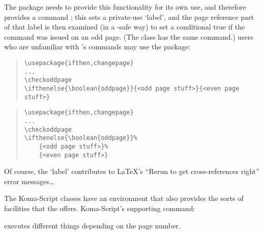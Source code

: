 The  package needs to provide this functionality
for its own use, and therefore provides a command ;
this sets a private-use `label', and the page reference part of that
label is then examined (in a -safe way) to set a
conditional  true if the command was issued on an odd
page.  (The  class has the same command.)  \latex{}
users who are unfamiliar with \tex{}'s  commands may use
the  package:
\begin{wideversion}
\begin{quote}
\begin{verbatim}
\usepackage{ifthen,changepage}
...
\checkoddpage
\ifthenelse{\boolean{oddpage}}{<odd page stuff>}{<even page stuff>}
\end{verbatim}
\end{quote}
\end{wideversion}
\begin{narrowversion}
\begin{quote}
\begin{verbatim}
\usepackage{ifthen,changepage}
...
\checkoddpage
\ifthenelse{\boolean{oddpage}}%
    {<odd page stuff>}%
    {<even page stuff>}
\end{verbatim}
\end{quote}
\end{narrowversion}

Of course, the `label' contributes to \LaTeX{}'s ``Rerun to get
cross-references right'' error messages\dots{}

The Koma-Script classes have an  environment
that also provides the sorts of facilities that the 
offers.  Koma-Script's supporting command:
\begin{quote}
\end{quote}
executes different things depending on the page number.

